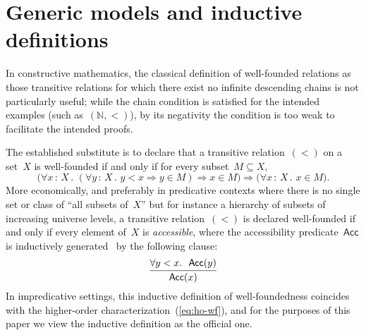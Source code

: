 \documentclass[envcountsect,envcountsame,runningheads]{llncs}
\newcommand{\xxx}[1]{}
\newcommand{\NN}{\mathbb{N}}
\renewcommand{\_}{\mathpunct{.}\,}
\newcommand{\?}{\,{:}\,}
\begin{document}
\xxx{properly define language}


\section{Generic models and inductive definitions}
\label{sect:generic-models}

In constructive mathematics, the classical definition of well-founded relations
as those transitive relations for which there exist no infinite descending
chains is not particularly useful; while the chain condition is satisfied for
the intended examples (such as~$(\NN,{<})$), by its negativity the condition is too weak to
facilitate the intended proofs.

The established substitute is to declare that a transitive relation~$({<})$ on a set~$X$
is well-founded if and only if for every subset~$M \subseteq X$,
\begin{equation}\label{eq:ho-wf}\tag{$\star$}
\bigl(\forall x\?X\_ (\forall y\?X\_ y < x \Rightarrow y \in M) \Rightarrow x \in
M\bigr) \Longrightarrow \bigl(\forall x\?X\_ x \in M\bigr).
\end{equation}
More economically, and preferably in predicative contexts where there is no
single set or class of ``all subsets of~$X$'' but for instance a
hierarchy of subsets of increasing universe levels, a transitive relation~$({<})$ is
declared well-founded if and only if every element of~$X$ is \emph{accessible}, where
the accessibility predicate~$\mathsf{Acc}$ is inductively generated~\cite{xxx}
by the following clause:
\[
  \infer{\mathsf{Acc}(x)}{\forall y<x\_\ \mathsf{Acc}(y)}
\]
In impredicative settings, this inductive definition of well-foundedness
coincides with the higher-order characterization~(\ref{eq:ho-wf}), and for the
purposes of this paper we view the inductive definition as the official one.
\end{document}
